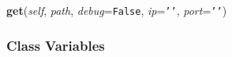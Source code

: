     \label{Cache:FileCache:get}

    \vspace{0.5ex}

\hspace{.8\funcindent}\begin{boxedminipage}{\funcwidth}

    \raggedright \textbf{get}(\textit{self}, \textit{path}, \textit{debug}={\tt False}, \textit{ip}={\tt \texttt{'}\texttt{}\texttt{'}}, \textit{port}={\tt \texttt{'}\texttt{}\texttt{'}})

\setlength{\parskip}{2ex}
\setlength{\parskip}{1ex}
    \end{boxedminipage}



  \subsubsection{Class Variables}

